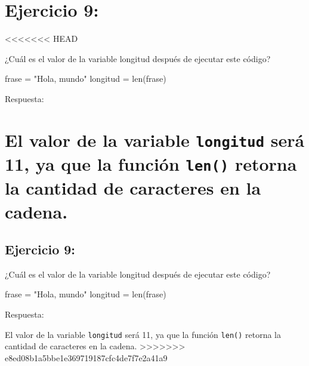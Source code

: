 \documentclass[
  a4paper,
  onepage,
  openany]{scrreprt}
\newenvironment{Shaded}{\begin{snugshade}}{\end{snugshade}}
\newcommand{\BuiltInTok}[1]{\textcolor[rgb]{0.00,0.23,0.31}{#1}}
\newcommand{\NormalTok}[1]{\textcolor[rgb]{0.00,0.23,0.31}{#1}}
\newcommand{\OperatorTok}[1]{\textcolor[rgb]{0.37,0.37,0.37}{#1}}
\newcommand{\StringTok}[1]{\textcolor[rgb]{0.13,0.47,0.30}{#1}}
\begin{document}
\hypertarget{ejercicio-9}{%
\chapter{Ejercicio 9:}\label{ejercicio-9}}

\textless\textless\textless\textless\textless\textless\textless{} HEAD

¿Cuál es el valor de la variable longitud después de ejecutar este
código?

\begin{Shaded}
\begin{Highlighting}[]
\NormalTok{frase }\OperatorTok{=} \StringTok{"Hola, mundo"}
\NormalTok{longitud }\OperatorTok{=} \BuiltInTok{len}\NormalTok{(frase)}
\end{Highlighting}
\end{Shaded}

Respuesta:

\hypertarget{el-valor-de-la-variable-longitud-seruxe1-11-ya-que-la-funciuxf3n-len-retorna-la-cantidad-de-caracteres-en-la-cadena.}{%
\chapter{\texorpdfstring{El valor de la variable \texttt{longitud} será
11, ya que la función \texttt{len()} retorna la cantidad de caracteres
en la
cadena.}{El valor de la variable longitud será 11, ya que la función len() retorna la cantidad de caracteres en la cadena.}}\label{el-valor-de-la-variable-longitud-seruxe1-11-ya-que-la-funciuxf3n-len-retorna-la-cantidad-de-caracteres-en-la-cadena.}}

\hypertarget{ejercicio-9-1}{%
\section{Ejercicio 9:}\label{ejercicio-9-1}}

¿Cuál es el valor de la variable longitud después de ejecutar este
código?

\begin{Shaded}
\begin{Highlighting}[]
\NormalTok{frase }\OperatorTok{=} \StringTok{"Hola, mundo"}
\NormalTok{longitud }\OperatorTok{=} \BuiltInTok{len}\NormalTok{(frase)}
\end{Highlighting}
\end{Shaded}

Respuesta:

El valor de la variable \texttt{longitud} será 11, ya que la función
\texttt{len()} retorna la cantidad de caracteres en la cadena.
\textgreater\textgreater\textgreater\textgreater\textgreater\textgreater\textgreater{}
e8ed08b1a5bbe1e369719187cfc4de7f7e2a41a9
\end{document}
